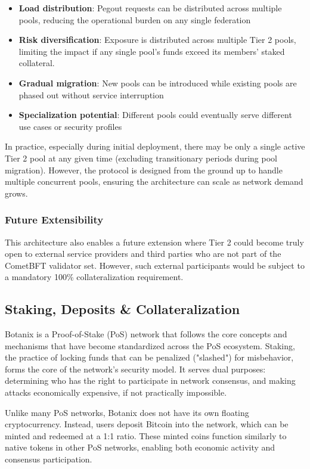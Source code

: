 \begin{itemize}
    \item \textbf{Load distribution}: Pegout requests can be distributed across multiple pools, reducing the operational burden on any single federation
    \item \textbf{Risk diversification}: Exposure is distributed across multiple Tier 2 pools, limiting the impact if any single pool's funds exceed its members' staked collateral.
    \item \textbf{Gradual migration}: New pools can be introduced while existing pools are phased out without service interruption
    \item \textbf{Specialization potential}: Different pools could eventually serve different use cases or security profiles
\end{itemize}

In practice, especially during initial deployment, there may be only a single active Tier 2 pool at any given time (excluding transitionary periods during pool migration). However, the protocol is designed from the ground up to handle multiple concurrent pools, ensuring the architecture can scale as network demand grows.

\subsubsection{Future Extensibility}

This architecture also enables a future extension where Tier 2 could become truly open to external service providers and third parties who are not part of the CometBFT validator set. However, such external participants would be subject to a mandatory 100\% collateralization requirement.

\subsection{Staking, Deposits \& Collateralization}

Botanix is a Proof-of-Stake (PoS) network that follows the core concepts and mechanisms that have become standardized across the PoS ecosystem. Staking, the practice of locking funds that can be penalized ("slashed") for misbehavior, forms the core of the network's security model. It serves dual purposes: determining who has the right to participate in network consensus, and making attacks economically expensive, if not practically impossible.

Unlike many PoS networks, Botanix does not have its own floating cryptocurrency. Instead, users deposit Bitcoin into the network, which can be minted and redeemed at a 1:1 ratio. These minted coins function similarly to native tokens in other PoS networks, enabling both economic activity and consensus participation.

